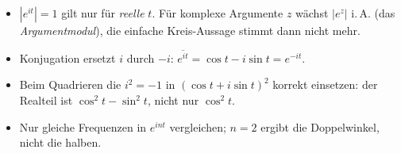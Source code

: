 \begin{achtung}
\begin{itemize}
  \item $|e^{it}|=1$ gilt nur für \emph{reelle} $t$. Für komplexe
        Argumente $z$ wächst $|e^z|$ i.\,A. (das \emph{Argumentmodul}), die
        einfache Kreis-Aussage stimmt dann nicht mehr.
  \item Konjugation ersetzt $i$ durch $-i$: $\overline{e^{it}}=
        \cos t-i\sin t=e^{-it}$.
  \item Beim Quadrieren die $i^2=-1$ in $(\cos t+i\sin t)^2$ korrekt
        einsetzen: der Realteil ist $\cos^2t-\sin^2t$, nicht nur $\cos^2t$.
  \item Nur gleiche Frequenzen in $e^{int}$ vergleichen; $n=2$ ergibt die
        Doppelwinkel, nicht die halben.
\end{itemize}
\end{achtung}
